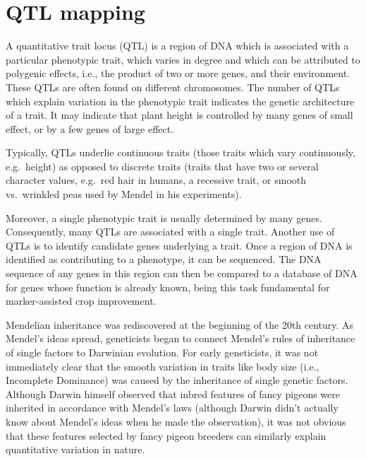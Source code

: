 \hypertarget{qtl-mapping}{%
\section{QTL mapping}\label{qtl-mapping}}

A quantitative trait locus (QTL) is a region of DNA which is associated with a particular phenotypic trait, which varies in degree and which can be attributed to polygenic effects, i.e., the product of two or more genes, and their environment. These QTLs are often found on different chromosomes. The number of QTLs which explain variation in the phenotypic trait indicates the genetic architecture of a trait. It may indicate that plant height is controlled by many genes of small effect, or by a few genes of large effect.

Typically, QTLs underlie continuous traits (those traits which vary continuously, e.g.~height) as opposed to discrete traits (traits that have two or several character values, e.g.~red hair in humans, a recessive trait, or smooth vs.~wrinkled peas used by Mendel in his experiments).

Moreover, a single phenotypic trait is usually determined by many genes. Consequently, many QTLs are associated with a single trait. Another use of QTLs is to identify candidate genes underlying a trait. Once a region of DNA is identified as contributing to a phenotype, it can be sequenced. The DNA sequence of any genes in this region can then be compared to a database of DNA for genes whose function is already known, being this task fundamental for marker-assisted crop improvement.

Mendelian inheritance was rediscovered at the beginning of the 20th century. As Mendel's ideas spread, geneticists began to connect Mendel's rules of inheritance of single factors to Darwinian evolution. For early geneticists, it was not immediately clear that the smooth variation in traits like body size (i.e., Incomplete Dominance) was caused by the inheritance of single genetic factors. Although Darwin himself observed that inbred features of fancy pigeons were inherited in accordance with Mendel's laws (although Darwin didn't actually know about Mendel's ideas when he made the observation), it was not obvious that these features selected by fancy pigeon breeders can similarly explain quantitative variation in nature.

